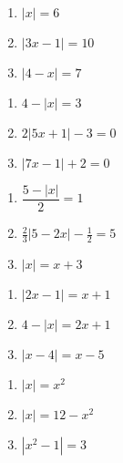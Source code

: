 \begin{multicols}{3}
\begin{enumerate}

\item  $|x| = 6$ \label{solveabsvalequfirst} 
\item $|3x-1| = 10$
\item $|4-x| = 7$

\setcounter{HW}{\value{enumi}}
\end{enumerate}
\end{multicols}

\begin{multicols}{3}
\begin{enumerate}
\setcounter{enumi}{\value{HW}}

\item  $4 - |x| = 3$
\item $2|5x+1| - 3 = 0$
\item $|7x-1| + 2 = 0$

\setcounter{HW}{\value{enumi}}
\end{enumerate}
\end{multicols}

\begin{multicols}{3}
\begin{enumerate}
\setcounter{enumi}{\value{HW}}

\item $\dfrac{5 - |x|}{2} = 1$
\item $\frac{2}{3} |5-2x| - \frac{1}{2} = 5$ 
\item $|x| = x + 3$ 

\setcounter{HW}{\value{enumi}}
\end{enumerate}
\end{multicols}


\begin{multicols}{3}
\begin{enumerate}
\setcounter{enumi}{\value{HW}}

\item  $|2x-1| = x+1$
\item  $4 - |x| = 2x+1$
\item  $|x-4| = x-5$

\setcounter{HW}{\value{enumi}}
\end{enumerate}
\end{multicols}


\begin{multicols}{3}
\begin{enumerate}
\setcounter{enumi}{\value{HW}}

\item  $|x| = x^2$
\item $|x| = 12 - x^2$
\item $|x^2 - 1| = 3$ \label{solveabsvalequlast}

\setcounter{HW}{\value{enumi}}
\end{enumerate}
\end{multicols}

